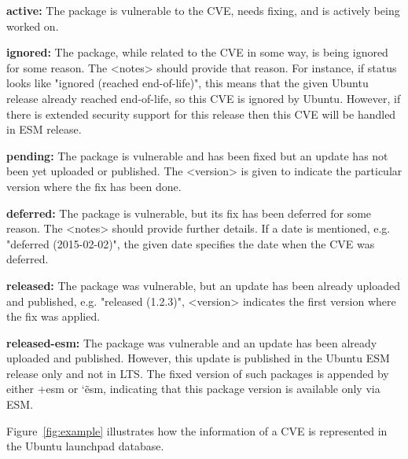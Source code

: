 \noindent\textbf{active:} The package is vulnerable to the
                CVE, needs fixing, and is actively being worked on.

\noindent\textbf{ignored:} The package, while related to the
                CVE in some way, is being ignored for some reason. The
                <notes> should provide that reason. For instance, if status looks like
                "ignored (reached end-of-life)", this means that the given Ubuntu release already reached
                end-of-life, so this CVE is ignored by Ubuntu. However, if there
                is extended security support for this release then this
                CVE will be handled in ESM release.

\noindent\textbf{pending:} The package is vulnerable and
                  has been fixed but an update has not been yet uploaded or
                  published. The <version> is given to indicate the particular
                  version where the fix has been done.

\noindent\textbf{deferred:} The package is vulnerable, but
                   its fix has been deferred for some reason. The <notes>
                   should provide further details. If a date is mentioned, e.g.
                   "deferred (2015-02-02)", the given date specifies the date when
                   the CVE was deferred.

\noindent\textbf{released:} The package was vulnerable, but
                an update has been already uploaded and published, e.g. "released (1.2.3)",
                <version> indicates the first version where the fix was applied.

\noindent\textbf{released-esm:} The package was vulnerable and
                an update has been already uploaded and published. However,
                this update is published in the Ubuntu ESM release only and not in LTS.
                The fixed version of such packages is appended by either
                +esm or \char`\~esm, indicating that this package version is available
                only via ESM.

\noindent Figure~\ref{fig:example} illustrates how the information of a CVE is represented
in the Ubuntu launchpad database.

\begin{center}
\label{fig:example}
\end{center}


